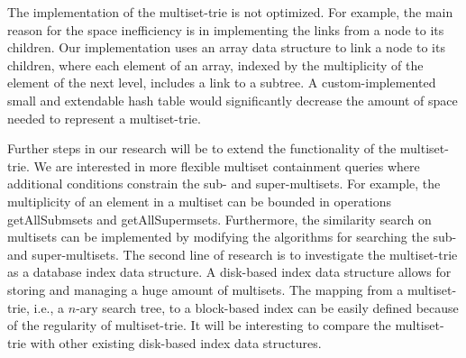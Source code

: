 \documentclass[algorithms,article,accept,pdftex,moreauthors]{Definitions/mdpi}
\begin{document}
The implementation of the multiset-trie is not optimized. For example, the main reason for the space inefficiency is in implementing the links from a node to its children. Our implementation uses an array data structure to link a node to its children, where each element of an array, indexed by the multiplicity of the element of the next level, includes a link to a subtree. A custom-implemented small and extendable hash table would significantly decrease the amount of space needed to represent a multiset-trie.

%
Further steps in our research will be to extend the functionality of the multiset-trie. We are interested in more flexible multiset containment queries where additional conditions constrain the sub- and super-multisets. For example, the multiplicity of an element in a multiset can be bounded in operations getAllSubmsets and getAllSupermsets. Furthermore, the similarity search on multisets can be implemented by modifying the algorithms for searching the sub- and super-multisets. 
%
The second line of research is to investigate the multiset-trie as a database index data structure. A disk-based index data structure allows for storing and managing a huge amount of multisets. The mapping from a multiset-trie, i.e., a $n$-ary search tree, to a block-based index can be easily defined because of the regularity of multiset-trie. It will be interesting to compare the multiset-trie with other existing disk-based index data structures.

\vspace{6pt} 


\end{document}
